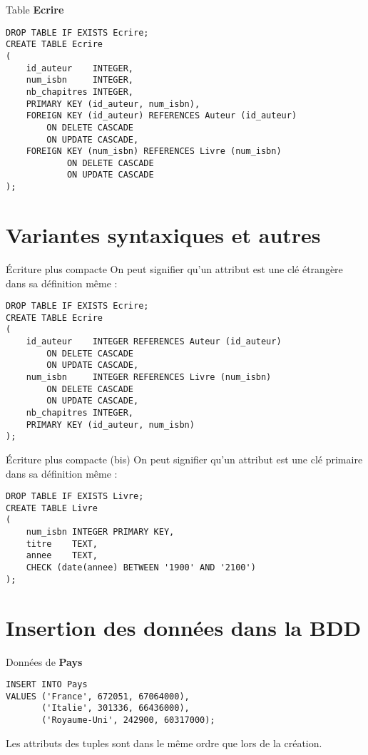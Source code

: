 \documentclass[10pt]{beamer}
\begin{document}
\begin{frame}[fragile]{Table \textbf{Ecrire}}
\begin{verbatim}
DROP TABLE IF EXISTS Ecrire;
CREATE TABLE Ecrire
(
    id_auteur    INTEGER,
    num_isbn     INTEGER,
    nb_chapitres INTEGER,
    PRIMARY KEY (id_auteur, num_isbn),
    FOREIGN KEY (id_auteur) REFERENCES Auteur (id_auteur)
        ON DELETE CASCADE
        ON UPDATE CASCADE,
    FOREIGN KEY (num_isbn) REFERENCES Livre (num_isbn)
            ON DELETE CASCADE
            ON UPDATE CASCADE
);
\end{verbatim}
\end{frame}
\section{Variantes syntaxiques et autres}
\begin{frame}[fragile]{\'Ecriture plus compacte}
On peut signifier qu'un attribut est une clé étrangère dans sa définition même :\pause
\begin{verbatim}
DROP TABLE IF EXISTS Ecrire;
CREATE TABLE Ecrire
(
    id_auteur    INTEGER REFERENCES Auteur (id_auteur)
        ON DELETE CASCADE
        ON UPDATE CASCADE,
    num_isbn     INTEGER REFERENCES Livre (num_isbn)
        ON DELETE CASCADE
        ON UPDATE CASCADE,
    nb_chapitres INTEGER,
    PRIMARY KEY (id_auteur, num_isbn)
);
\end{verbatim}
\end{frame}

\begin{frame}[fragile]{\'Ecriture plus compacte (bis)}
On peut signifier qu'un attribut est une clé primaire dans sa définition même :\pause
\begin{verbatim}
DROP TABLE IF EXISTS Livre;
CREATE TABLE Livre
(
    num_isbn INTEGER PRIMARY KEY,
    titre    TEXT,
    annee    TEXT,
    CHECK (date(annee) BETWEEN '1900' AND '2100')
);
\end{verbatim}
\end{frame}


\section{Insertion des données dans la BDD}


\begin{frame}[fragile]{Données de \textbf{Pays}}
\begin{verbatim}
INSERT INTO Pays
VALUES ('France', 672051, 67064000),
       ('Italie', 301336, 66436000),
       ('Royaume-Uni', 242900, 60317000);
\end{verbatim}
Les attributs des tuples sont dans le même ordre que lors de la création.
\end{frame}
\end{document}
